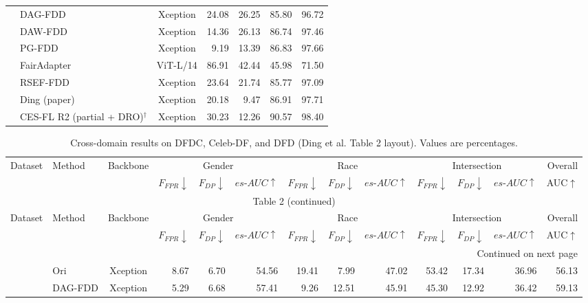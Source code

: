 \documentclass[9pt]{article}
\begin{document}
\begin{landscape}
\begin{longtable}{llcrrrr}
 & DAG-FDD & Xception & 24.08 & 26.25 & 85.80 & 96.72\\
 & DAW-FDD & Xception & 14.36 & 26.13 & 86.74 & 97.46\\
 & PG-FDD & Xception & 9.19 & 13.39 & 86.83 & 97.66\\
 & FairAdapter & ViT-L/14 & 86.91 & 42.44 & 45.98 & 71.50\\
 & RSEF-FDD & Xception & 23.64 & 21.74 & 85.77 & 97.09\\
 & Ding (paper) & Xception & 20.18 & 9.47 & 86.91 & 97.71\\
\rowcolor{blue!8} & CES-FL R2 (partial + DRO)$^{\dagger}$ & Xception & 30.23 & 12.26 & 90.57 & 98.40\\
\midrule
\end{longtable}\end{landscape}
\begin{landscape}\tiny\setlength{\tabcolsep}{3pt}\begin{longtable}{llc|rrr|rrr|rrr|r}
\caption{Cross-domain results on DFDC, Celeb-DF, and DFD (Ding et al. Table 2 layout). Values are percentages.}\label{tab:table2}\\
\toprule Dataset & Method & Backbone & \multicolumn{3}{c|}{Gender} & \multicolumn{3}{c|}{Race} & \multicolumn{3}{c|}{Intersection} & Overall\\
& & & $F_{FPR}\downarrow$ & $F_{DP}\downarrow$ & $es\text{-}AUC\uparrow$ & $F_{FPR}\downarrow$ & $F_{DP}\downarrow$ & $es\text{-}AUC\uparrow$ & $F_{FPR}\downarrow$ & $F_{DP}\downarrow$ & $es\text{-}AUC\uparrow$ & AUC$\uparrow$\\\midrule\endfirsthead
\multicolumn{13}{c}{Table 2 (continued)}\\\toprule Dataset & Method & Backbone & \multicolumn{3}{c|}{Gender} & \multicolumn{3}{c|}{Race} & \multicolumn{3}{c|}{Intersection} & Overall\\
& & & $F_{FPR}\downarrow$ & $F_{DP}\downarrow$ & $es\text{-}AUC\uparrow$ & $F_{FPR}\downarrow$ & $F_{DP}\downarrow$ & $es\text{-}AUC\uparrow$ & $F_{FPR}\downarrow$ & $F_{DP}\downarrow$ & $es\text{-}AUC\uparrow$ & AUC$\uparrow$\\\midrule\endhead
\midrule\multicolumn{13}{r}{Continued on next page}\\\endfoot\bottomrule\endlastfoot
\multirow{8}{*}{DFDC} & Ori & Xception & 8.67 & 6.70 & 54.56 & 19.41 & 7.99 & 47.02 & 53.42 & 17.34 & 36.96 & 56.13\\
 & DAG-FDD & Xception & 5.29 & 6.68 & 57.41 & 9.26 & 12.51 & 45.91 & 45.30 & 12.92 & 36.42 & 59.13\\

\end{longtable}
\end{landscape}
\end{document}

